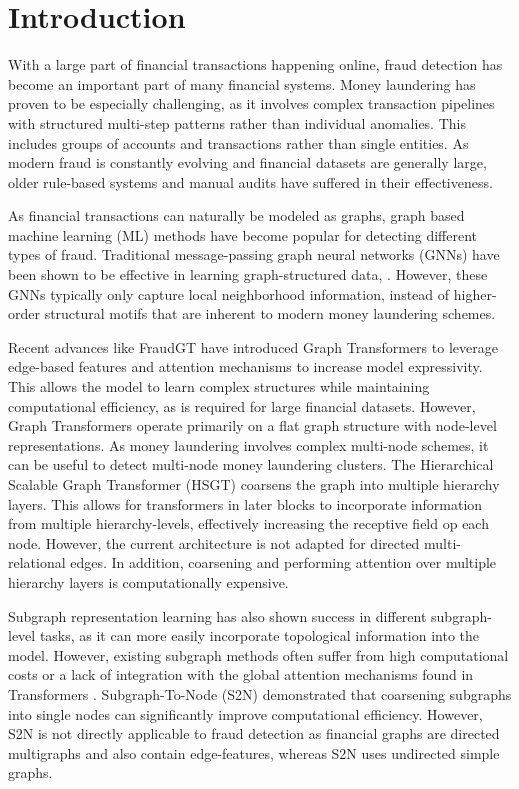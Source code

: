 \documentclass[12pt, twocolumn]{report}
\begin{document}

\chapter{Introduction}

With a large part of financial transactions happening online, fraud detection has become an important part of many financial systems. Money laundering has proven to be especially challenging, as it involves complex transaction pipelines with  structured multi-step patterns rather than individual anomalies. This includes groups of accounts and transactions rather than single entities. As modern fraud is constantly evolving and financial datasets are generally large, older rule-based systems and manual audits have suffered in their effectiveness. 

As financial transactions can naturally be modeled as graphs, graph based machine learning (ML) methods have become popular for detecting different types of fraud. Traditional message-passing graph neural networks (GNNs) have been shown to be effective in learning graph-structured data, \cite{kipf2017semi,hamilton2017inductive,velivckovic2018gat}. However, these GNNs typically only capture local neighborhood information, instead of higher-order structural motifs that are inherent to modern money laundering schemes.

Recent advances like FraudGT \cite{fraudgt2024} have introduced Graph Transformers to leverage edge-based features and attention mechanisms to increase model expressivity. This allows the model to learn complex structures while maintaining computational efficiency, as is required for large financial datasets. However, Graph Transformers operate primarily on a flat graph structure with node-level representations. As money laundering involves complex multi-node schemes, it can be useful to detect multi-node money laundering clusters. The Hierarchical Scalable Graph Transformer (HSGT) \cite{zhu2023hierarchicaltransformerscalablegraph} coarsens the graph into multiple hierarchy layers. This allows for transformers in later blocks to incorporate information from multiple hierarchy-levels, effectively increasing the receptive field op each node. However, the current architecture is not adapted for directed multi-relational edges. In addition, coarsening and performing attention over multiple hierarchy layers is computationally expensive. 

Subgraph representation learning has also shown success in different subgraph-level tasks, as it can more easily incorporate topological information into the model. However, existing subgraph methods often suffer from high computational costs \cite{kim2024translating} or a lack of integration with the global attention mechanisms found in Transformers \cite{subgraphormer2024}. Subgraph-To-Node (S2N) \cite{kim2024translating} demonstrated that coarsening subgraphs into single nodes can significantly improve computational efficiency. However, S2N is not directly applicable to fraud detection as financial graphs are directed multigraphs and also contain edge-features, whereas S2N uses undirected simple graphs.
\end{document}
